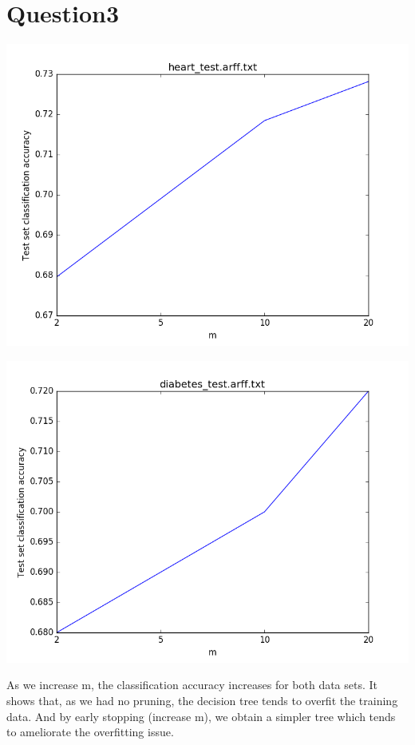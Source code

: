\documentclass[paper=a4, fontsize=11pt]{scrartcl} %
\numberwithin{equation}{section} %
\numberwithin{figure}{section} %
\numberwithin{table}{section} %
\begin{document}

\section*{Question3}
\begin{center}
\includegraphics[scale=.5]{pics/heart_acc_m.png}
\end{center}
\begin{center}
\includegraphics[scale=.5]{pics/diabetes_acc_m.png}
\end{center}

As we increase m, the classification accuracy increases for both data sets. It shows that, as we had no pruning, the decision tree tends to overfit the training data. And by early stopping (increase m), we obtain a simpler tree which tends to ameliorate the overfitting issue. 
\end{document}
